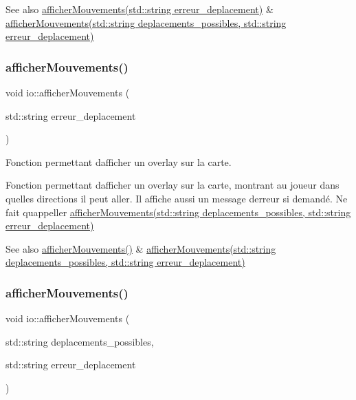 \begin{DoxySeeAlso}{See also}
\hyperlink{namespaceio_a45e9ac702aa6ea62eeca96e921b8eaa1}{afficher\+Mouvements(std\+::string erreur\+\_\+deplacement)} \& \hyperlink{namespaceio_ac0728fb89b032a7b33641e0d2c34cc28}{afficher\+Mouvements(std\+::string deplacements\+\_\+possibles, std\+::string erreur\+\_\+deplacement)} 
\end{DoxySeeAlso}
\mbox{\label{namespaceio_a45e9ac702aa6ea62eeca96e921b8eaa1}} 
\subsubsection{\texorpdfstring{afficher\+Mouvements()}{afficherMouvements()}\hspace{0.1cm}{\footnotesize\ttfamily [2/4]}}
{\footnotesize\ttfamily void io\+::afficher\+Mouvements (\begin{DoxyParamCaption}\item[{std\+::string}]{erreur\+\_\+deplacement }\end{DoxyParamCaption})}



Fonction permettant d\textquotesingle{}afficher un overlay sur la carte. 

Fonction permettant d\textquotesingle{}afficher un overlay sur la carte, montrant au joueur dans quelles directions il peut aller. Il affiche aussi un message d\textquotesingle{}erreur si demandé. Ne fait qu\textquotesingle{}appeller \hyperlink{namespaceio_ac0728fb89b032a7b33641e0d2c34cc28}{afficher\+Mouvements(std\+::string deplacements\+\_\+possibles, std\+::string erreur\+\_\+deplacement)}

\begin{DoxySeeAlso}{See also}
\hyperlink{namespaceio_ac60b7c3503eb53e69a2adc86368ab633}{afficher\+Mouvements()} \& \hyperlink{namespaceio_ac0728fb89b032a7b33641e0d2c34cc28}{afficher\+Mouvements(std\+::string deplacements\+\_\+possibles, std\+::string erreur\+\_\+deplacement)} 
\end{DoxySeeAlso}
\mbox{\label{namespaceio_ac0728fb89b032a7b33641e0d2c34cc28}} 
\subsubsection{\texorpdfstring{afficher\+Mouvements()}{afficherMouvements()}\hspace{0.1cm}{\footnotesize\ttfamily [3/4]}}
{\footnotesize\ttfamily void io\+::afficher\+Mouvements (\begin{DoxyParamCaption}\item[{std\+::string}]{deplacements\+\_\+possibles,  }\item[{std\+::string}]{erreur\+\_\+deplacement }\end{DoxyParamCaption})}



